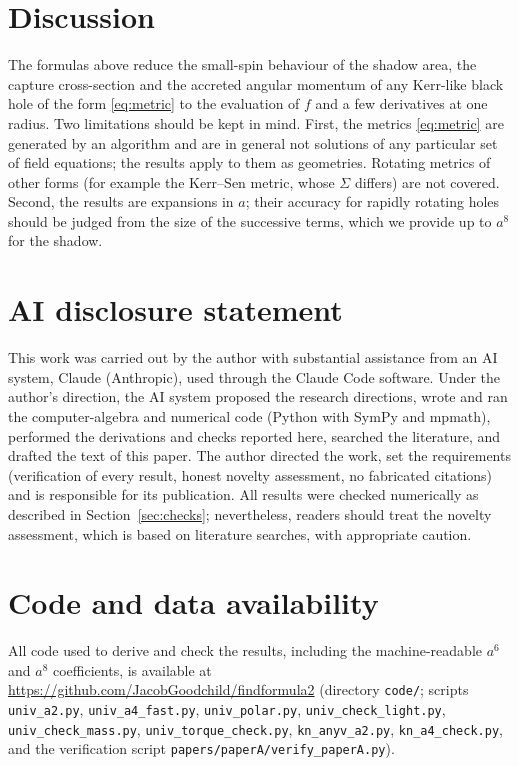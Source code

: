 \documentclass[11pt,a4paper]{article}
\theoremstyle{remark}
\numberwithin{equation}{section}
\begin{document}
\section{Discussion}
The formulas above reduce the small-spin behaviour of the shadow area, the capture cross-section
and the accreted angular momentum of any Kerr-like black hole of the form \eqref{eq:metric} to the
evaluation of $f$ and a few derivatives at one radius. Two limitations should be kept in mind.
First, the metrics \eqref{eq:metric} are generated by an algorithm and are in general not solutions of
any particular set of field equations; the results apply to them as geometries. Rotating metrics
of other forms (for example the Kerr--Sen metric, whose $\Sigma$ differs) are not covered. Second,
the results are expansions in $a$; their accuracy for rapidly rotating holes should be judged from
the size of the successive terms, which we provide up to $a^8$ for the shadow.

\section*{AI disclosure statement}
This work was carried out by the author with substantial assistance from an AI system, Claude
(Anthropic), used through the Claude Code software. Under the author's direction, the AI system
proposed the research directions, wrote and ran the computer-algebra and numerical code (Python
with SymPy and mpmath), performed the derivations and checks reported here, searched the
literature, and drafted the text of this paper. The author directed the work, set the requirements
(verification of every result, honest novelty assessment, no fabricated citations) and is
responsible for its publication. All results were checked numerically as described in
Section~\ref{sec:checks}; nevertheless, readers should treat the novelty assessment, which is based on
literature searches, with appropriate caution.

\begin{sloppypar}
\section*{Code and data availability}\label{sec:code}
All code used to derive and check the results, including the machine-readable $a^6$ and $a^8$
coefficients, is available at \url{https://github.com/JacobGoodchild/findformula2}
(directory \texttt{code/}; scripts \texttt{univ\_a2.py}, \texttt{univ\_a4\_fast.py},
\texttt{univ\_polar.py}, \texttt{univ\_check\_light.py}, \texttt{univ\_check\_mass.py},
\texttt{univ\_torque\_check.py}, \texttt{kn\_anyv\_a2.py}, \texttt{kn\_a4\_check.py}, and the
verification script \texttt{papers/paperA/verify\_paperA.py}).
\end{sloppypar}
\end{document}
